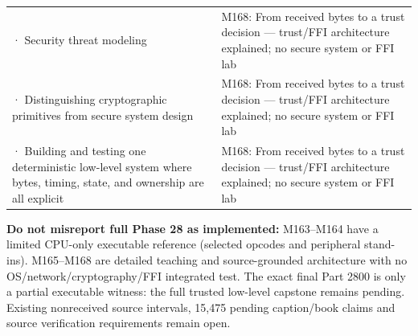 {\begin{longtable}[]{@{}
  >{\raggedright\arraybackslash}p{}
  >{\raggedright\arraybackslash}p{}@{}}
2798 · Security threat modeling & M168: From received bytes to a trust decision --- trust/FFI architecture explained; no secure system or FFI lab \\
2799 · Distinguishing cryptographic primitives from secure system design & M168: From received bytes to a trust decision --- trust/FFI architecture explained; no secure system or FFI lab \\
2800 · Building and testing one deterministic low-level system where bytes, timing, state, and ownership are all explicit & M168: From received bytes to a trust decision --- trust/FFI architecture explained; no secure system or FFI lab \\
\end{longtable}
}

\textbf{Do not misreport full Phase 28 as implemented:} M163--M164 have a limited CPU-only executable reference (selected opcodes and peripheral stand-ins). M165--M168 are detailed teaching and source-grounded architecture with no OS/network/cryptography/FFI integrated test. The exact final Part 2800 is only a partial executable witness: the full trusted low-level capstone remains pending. Existing nonreceived source intervals, 15,475 pending caption/book claims and source verification requirements remain open.
